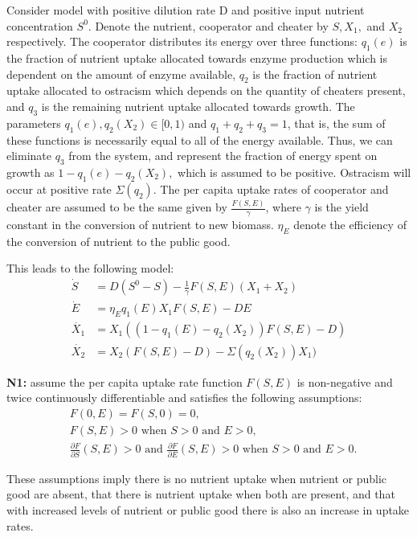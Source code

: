 \documentclass[12pt]{article}
\begin{document}
Consider model with positive dilution rate D and positive input nutrient concentration $S^0$. Denote the nutrient, cooperator and cheater by $S, X_1,$ and $X_2$ respectively. The cooperator distributes its energy over three functions: $q_1(e)$ is the fraction of nutrient uptake allocated towards enzyme production which is dependent on the amount of enzyme available, $q_2$ is the fraction of nutrient uptake allocated to ostracism which depends on the quantity of cheaters present, and $q_3$ is the remaining nutrient uptake allocated towards growth. The parameters $q_1(e), q_2(X_2) \in [0,1)$ and $q_1+q_2+q_3=1$, that is, the sum of these functions is necessarily equal to all of the energy available. Thus, we can eliminate $q_3$ from the system, and represent the fraction of energy spent on growth as $1-q_1(e)-q_2(X_2),$ which is assumed to be positive. Ostracism will occur at positive rate  $\Sigma(q_2)$. The per capita uptake rates of cooperator and cheater are assumed to be the same given by $\frac{F(S,E)}{\gamma}$, where $\gamma$ is the yield constant in the conversion of nutrient to new biomass. $\eta_E$ denote the efficiency of the conversion of nutrient to the public good. 

\noindent This leads to the following model: 
\begin{align}
\dot{S}&=D(S^0-S)-\frac{1}{\gamma}F(S,E)(X_1 + X_2)\\
\dot{E}&=\eta_E q_1(E) X_1 F(S,E)-DE\\
\dot{X_1} &= X_1((1-q_1(E)-q_2(X_2))F(S,E)-D)\\
\dot{X_2}&=X_2(F(S,E)-D)- \Sigma (q_2 (X_2)) X_1)
\end{align}

\noindent \textbf{N1:} assume the per capita uptake rate function $F(S,E)$ is non-negative and twice continuously differentiable and satisfies the following assumptions: 
\begin{align*}
&F(0,E)=F(S,0)=0,\\
&F(S,E)>0 \text{ when } S>0 \text{ and } E>0,\\
&\frac{\partial F}{\partial S}(S,E)>0 \text{ and } \frac{\partial F}{\partial E}(S,E)>0 \text { when } S>0 \text{ and } E>0.
\end{align*}

These assumptions imply there is no nutrient uptake when nutrient or public good are absent, that there is nutrient uptake when both are present, and that with increased levels of nutrient or public good there is also an increase in uptake rates. 
\end{document}
